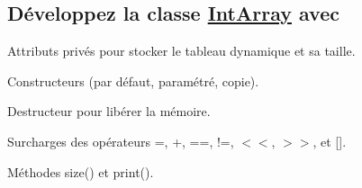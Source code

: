 \subsection*{Développez la classe \hyperlink{classIntArray}{Int\+Array} avec}


\begin{DoxyItemize}
\item Attributs privés pour stocker le tableau dynamique et sa taille.
\item Constructeurs (par défaut, paramétré, copie).
\item Destructeur pour libérer la mémoire.
\item Surcharges des opérateurs =, +, ==, !=, $<$$<$, $>$$>$, et \mbox{[}\mbox{]}.
\item Méthodes size() et print(). 
\end{DoxyItemize}